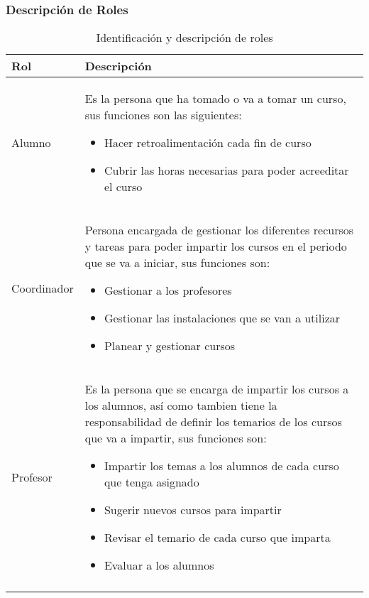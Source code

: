 \newpage
\subsubsection{Descripción de Roles}


\begin{longtable}{|p{5cm}|p{11cm}|}%
		\hline
			\textbf{Rol} & \textbf{Descripción}\\ %
		\hline\hline %
			{Alumno} & {Es la persona que ha tomado o va a tomar un curso, sus funciones son las siguientes:
		\begin{itemize}
			\item Hacer retroalimentaci\'on cada fin de curso
			\item Cubrir las horas necesarias para poder acreeditar el curso 
		\end{itemize}

}\\ %
		\hline
		{Coordinador} & {Persona encargada de gestionar los diferentes recursos y tareas para poder impartir los cursos en el periodo que se va a iniciar, sus funciones son:
			\begin{itemize}
				\item Gestionar a los profesores
				\item Gestionar las instalaciones que se van a utilizar
				\item Planear y gestionar cursos
			\end{itemize}
			}\\
		\hline
		{Profesor} & {Es la persona que se encarga de impartir los cursos a los alumnos, así como tambien tiene la responsabilidad de definir los temarios de los cursos que va a impartir, sus funciones son:
		\begin{itemize}
			\item Impartir los temas a los alumnos de cada curso que tenga asignado
			\item Sugerir nuevos cursos para impartir
			\item Revisar el temario de cada curso que imparta
			\item Evaluar a los alumnos
		\end{itemize}}\\
\caption{Identificación y descripción de roles}
\end{longtable}
